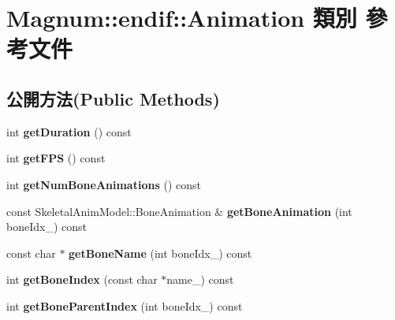 \hypertarget{class_magnum_1_1endif_1_1_animation}{}\section{Magnum\+:\+:endif\+:\+:Animation 類別 參考文件}
\label{class_magnum_1_1endif_1_1_animation}
\subsection*{公開方法(Public Methods)}
\begin{DoxyCompactItemize}
\item 
int {\bfseries get\+Duration} () const \hypertarget{class_magnum_1_1endif_1_1_animation_a81d74cb7c274d063f9c6215a85198b3d}{}\label{class_magnum_1_1endif_1_1_animation_a81d74cb7c274d063f9c6215a85198b3d}

\item 
int {\bfseries get\+F\+PS} () const \hypertarget{class_magnum_1_1endif_1_1_animation_a31561904888453f4dd31bf30eaf54c91}{}\label{class_magnum_1_1endif_1_1_animation_a31561904888453f4dd31bf30eaf54c91}

\item 
int {\bfseries get\+Num\+Bone\+Animations} () const \hypertarget{class_magnum_1_1endif_1_1_animation_aa859f5e0b78ef60cf639372eaaaa09f1}{}\label{class_magnum_1_1endif_1_1_animation_aa859f5e0b78ef60cf639372eaaaa09f1}

\item 
const Skeletal\+Anim\+Model\+::\+Bone\+Animation \& {\bfseries get\+Bone\+Animation} (int bone\+Idx\+\_\+) const \hypertarget{class_magnum_1_1endif_1_1_animation_ad403c92ff9f4ffebdc545134e7baa271}{}\label{class_magnum_1_1endif_1_1_animation_ad403c92ff9f4ffebdc545134e7baa271}

\item 
const char $\ast$ {\bfseries get\+Bone\+Name} (int bone\+Idx\+\_\+) const \hypertarget{class_magnum_1_1endif_1_1_animation_a38fcb62e83f3f166020f75b89f58ce8f}{}\label{class_magnum_1_1endif_1_1_animation_a38fcb62e83f3f166020f75b89f58ce8f}

\item 
int {\bfseries get\+Bone\+Index} (const char $\ast$name\+\_\+) const \hypertarget{class_magnum_1_1endif_1_1_animation_ae95861b04e9f12804b6631c5e7049fd5}{}\label{class_magnum_1_1endif_1_1_animation_ae95861b04e9f12804b6631c5e7049fd5}

\item 
int {\bfseries get\+Bone\+Parent\+Index} (int bone\+Idx\+\_\+) const \hypertarget{class_magnum_1_1endif_1_1_animation_a0046627573bd701d738533dc4dbbfc24}{}\label{class_magnum_1_1endif_1_1_animation_a0046627573bd701d738533dc4dbbfc24}


\end{DoxyCompactItemize}
